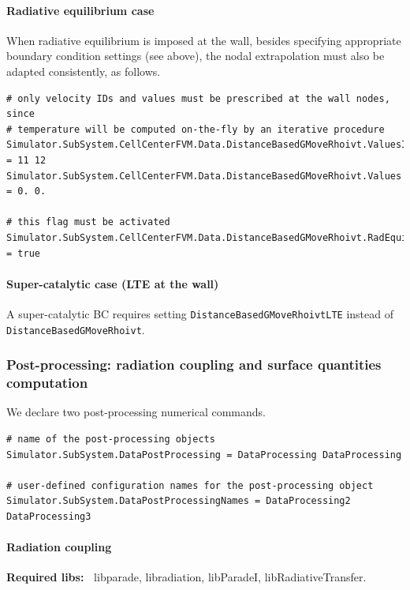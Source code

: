 \documentclass[11pt]{article}
\begin{document}
\paragraph{Radiative equilibrium case}

When radiative equilibrium is imposed at the wall, besides specifying appropriate boundary condition settings (see above),
the nodal extrapolation must also be adapted consistently, as follows.

\begin{lstlisting}[breaklines]
# only velocity IDs and values must be prescribed at the wall nodes, since 
# temperature will be computed on-the-fly by an iterative procedure  
Simulator.SubSystem.CellCenterFVM.Data.DistanceBasedGMoveRhoivt.ValuesIdx = 11 12 
Simulator.SubSystem.CellCenterFVM.Data.DistanceBasedGMoveRhoivt.Values = 0. 0.

# this flag must be activated
Simulator.SubSystem.CellCenterFVM.Data.DistanceBasedGMoveRhoivt.RadEquilibrium = true
\end{lstlisting}

\paragraph{Super-catalytic case (LTE at the wall)}

A super-catalytic BC requires setting {\tt DistanceBasedGMoveRhoivtLTE} instead of  
{\tt DistanceBasedGMoveRhoivt}.

\subsubsection{Post-processing: radiation coupling and surface quantities computation}

We declare two post-processing numerical commands.

\begin{lstlisting}[breaklines]
# name of the post-processing objects
Simulator.SubSystem.DataPostProcessing = DataProcessing DataProcessing

# user-defined configuration names for the post-processing object 
Simulator.SubSystem.DataPostProcessingNames = DataProcessing2 DataProcessing3
\end{lstlisting}

\paragraph{Radiation coupling}

{\bf Required libs:~} libparade, libradiation, libParadeI, libRadiativeTransfer.
\end{document}
